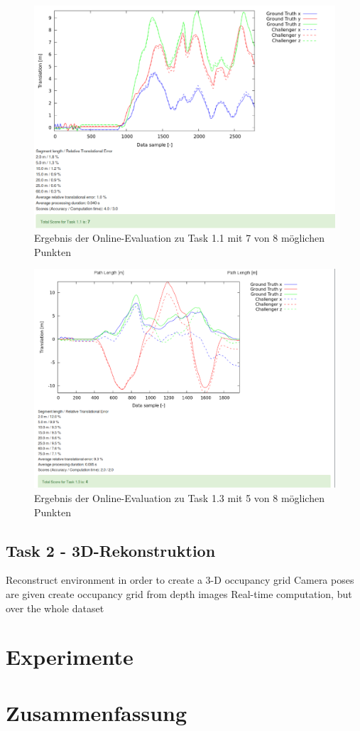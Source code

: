 \documentclass[12pt,titlepage, a4paper]{article}
\begin{document}
\begin{figure}
 \centering
 \includegraphics[width=\textwidth]{./Screens/t1_opt2_april.png}
 \caption{Ergebnis der Online-Evaluation zu Task 1.1 mit 7 von 8 möglichen Punkten} \label{fig:evat1}
\end{figure}
\begin{figure}
 \centering
 \includegraphics[width=\textwidth]{./Screens/t3_checkerboard.png}
 \caption{Ergebnis der Online-Evaluation zu Task 1.3 mit 5 von 8 möglichen Punkten} \label{fig:evat3}
\end{figure}


				
\subsection{Task 2 - 3D-Rekonstruktion}

Reconstruct environment in order to create a 3-D occupancy grid
Camera poses are given
create occupancy grid from depth images
Real-time computation, but over the whole dataset



\section{Experimente}




\section{Zusammenfassung}

  
  
\end{document}
